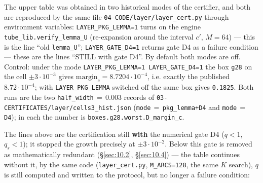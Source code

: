 The upper table was obtained in two historical modes of the certifier, and
both are reproduced by the same file \texttt{04-\allowbreak CODE/\allowbreak layer/\allowbreak layer\_\allowbreak cert.py} through
environment variables: \texttt{LAYER\_\allowbreak PKG\_\allowbreak LEMMA=1} turns on the engine
\texttt{tube\_\allowbreak lib.verify\_\allowbreak lemma\_\allowbreak U} (re-expansion around the interval $c'$, $M=64$) ---
this is the line ``old \texttt{lemma\_U}''; \texttt{LAYER\_\allowbreak GATE\_\allowbreak D4=1} returns gate D4 as a
failure condition --- these are the lines ``STILL with gate D4''. By default
both modes are off.
Control: under the mode \texttt{LAYER\_\allowbreak PKG\_\allowbreak LEMMA=1 LAYER\_\allowbreak GATE\_\allowbreak D4=1}
the box \texttt{g28} on the cell $\pm 3\cdot 10^{-3}$ gives $\mathrm{margin}_c = 8.7204\cdot 10^{-4}$, i.e.
exactly the published $8.72\cdot 10^{-4}$; with \texttt{LAYER\_\allowbreak PKG\_\allowbreak LEMMA}
switched off the same box gives \texttt{0.1825}. Both runs are the two
\texttt{half\_\allowbreak width}$\,=\,$0.003 records of
\texttt{03-\allowbreak CERTIFICATES/\allowbreak layer/\allowbreak cells3\_\allowbreak hist.json}
(\texttt{mode}$\,=\,$\texttt{pkg\_\allowbreak lemma+D4} and \texttt{mode}$\,=\,$\texttt{D4});
in each the number is
\texttt{boxes.\allowbreak g28.\allowbreak worst.\allowbreak D\_\allowbreak margin\_\allowbreak c}.

The lines above are the certification still \textbf{with} the numerical gate D4
($q<1$, $q_s<1$); it stopped the growth precisely at $\pm 3\cdot 10^{-2}$. Below this
gate is removed as mathematically redundant (\S\ref{sec:10.2}, \S\ref{sec:10.4}) --- the table continues
without it, by the same code (\texttt{layer\_\allowbreak cert.py}, \texttt{M\_ARCS=128}, the same $K$
search), $q$ is still computed and written to the protocol, but no longer a
failure condition:

